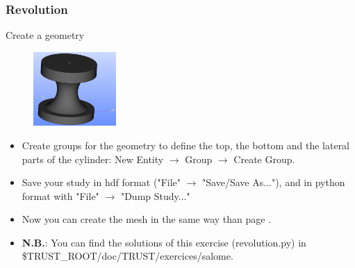 \documentclass[10pt, hyperref={unicode=true,pdfusetitle, bookmarks=true,bookmarksnumbered=false,bookmarksopen=false, breaklinks=false,pdfborder={0 0 1},backref=true,colorlinks=true,linkcolor=darkblue,pageanchor}]{beamer}
\begin{document}
\begin{frame}
\frametitle{Revolution}
\begin{block}{Create a geometry}

\begin{figure}
\includegraphics[width=0.28\textwidth]{PICTURES/salome8.jpg}
\end{figure}

\begin{itemize}
\item Create groups for the geometry to define the top, the bottom and the lateral parts of the cylinder: New Entity $\rightarrow$ Group $\rightarrow$ Create Group.
\item Save your study in hdf format ("File" $\rightarrow$ "Save/Save As..."), and in python format with "File" $\rightarrow$ "Dump Study..."
\item Now you can create the mesh in the same way than page \pageref{salome_mesh}.
\item \textbf{N.B.}: You can find the solutions of this exercise (revolution.py) in \$TRUST\_ROOT/doc/TRUST/exercices/salome.
\end{itemize}

\end{block}
\end{frame}
\end{document}
